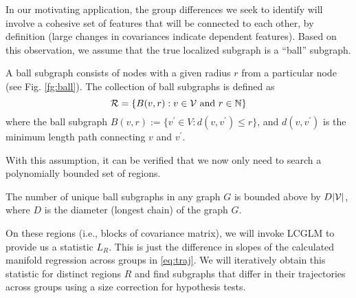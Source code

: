 In our motivating application, the group differences we seek to identify will involve a cohesive set of features that will be 
connected to each other, by definition (large changes in covariances indicate dependent features). 
Based on this observation, we assume that the true localized subgraph is a ``ball'' subgraph. 
\begin{definition} A ball subgraph consists of nodes with a given radius $r$ from a particular node (see Fig. \ref{fg:ball}). The collection of ball subgraphs is defined as
\begin{equation}
\mathcal{R}=\left\{B(v,r):v\in \mathcal{V}\ {\rm and}\ r\in \mathbb{N}\right\}
\end{equation}
where the ball subgraph $B(v,r):=\{v^\prime \in V:d(v,v^\prime)\le r\}$, and $d(v,v^\prime)$ is the minimum length path connecting $v$ and $v^\prime$.
\end{definition}
%
With this assumption, it can be verified that we now only need to search a polynomially bounded set of regions.
\begin{remark}
The number of unique ball subgraphs in any graph $G$ is bounded above by $D|\mathcal{V}|$, where $D$ is the diameter (longest chain) of the graph $G$.
\end{remark}
 On these regions 
(i.e., blocks of covariance matrix), 
we will invoke LCGLM to provide us a statistic $L_R$. This is just the difference in slopes of the calculated manifold regression across groups in \eqref{eq:traj}. 
We will iteratively obtain this statistic for distinct regions $R$ and find subgraphs that differ in their trajectories across groups using a size correction for hypothesis tests.
